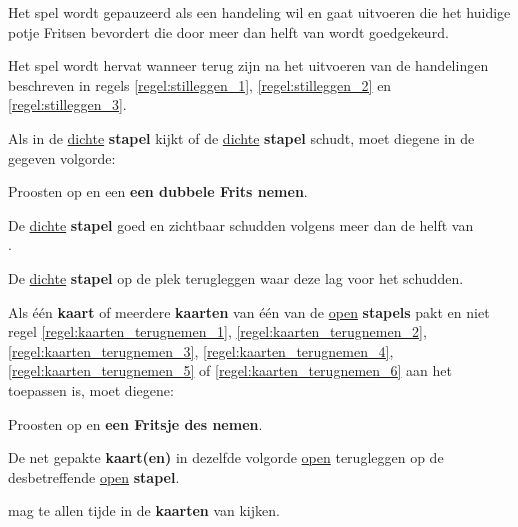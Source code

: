 \vervolgLijst{}
\item Het spel wordt gepauzeerd als \eenSpeler een handeling wil en gaat uitvoeren die het huidige potje Fritsen bevordert die door meer dan helft van \alleSpelers wordt goedgekeurd.
\label{regel:stilleggen_3}
\eindLijst{}

\vervolgLijst{}
\item Het spel wordt hervat wanneer \alleSpelers terug zijn na het uitvoeren van de handelingen beschreven in regels \ref{regel:stilleggen_1}, \ref{regel:stilleggen_2} en \ref{regel:stilleggen_3}.
\label{regel:stilleggen_4}
\eindLijst{}


\vervolgLijst{}
\item Als \eenSpeler in de \ul{dichte} \textbf{stapel} kijkt of de \ul{dichte} \textbf{stapel} schudt, moet diegene in de gegeven volgorde:
\puntLijst{}
\item Proosten op  en een \textbf{een dubbele Frits nemen}\footnotemark[1].
\item De \ul{dichte} \textbf{stapel} goed en zichtbaar schudden volgens meer dan de helft van \\ \alleSpelersN.
\item De \ul{dichte} \textbf{stapel} op de plek terugleggen waar deze lag voor het schudden.
\eindPuntLijst{}
\label{regel:kijken_in_dichte_stapel}
\eindLijst{}

\vervolgLijst{}
\item Als \eenSpeler één \textbf{kaart} of meerdere \textbf{kaarten} van één van de \ul{open} \textbf{stapels} pakt en niet regel \ref{regel:kaarten_terugnemen_1}, \ref{regel:kaarten_terugnemen_2}, \ref{regel:kaarten_terugnemen_3}, \ref{regel:kaarten_terugnemen_4}, \ref{regel:kaarten_terugnemen_5} of \ref{regel:kaarten_terugnemen_6} aan het toepassen is, moet diegene:
\puntLijst{}
\item Proosten op  en \textbf{een Fritsje des nemen}\footnotemark[2].
\item De net gepakte \textbf{kaart(en)} in dezelfde volgorde \ul{open} terugleggen op de desbetreffende \ul{open} \textbf{stapel}.
\eindPuntLijst{}
\eindLijst{}


\vervolgLijst{}
\item \EenSpeler mag te allen tijde in de \textbf{kaarten} van \alleSpelers kijken.
\eindLijst{}

